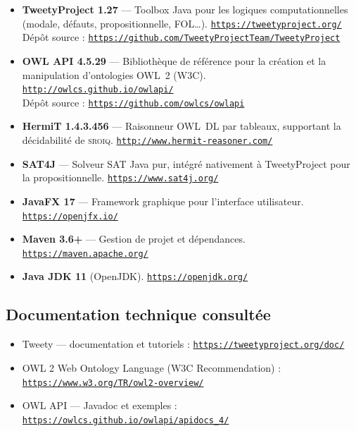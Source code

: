 \documentclass[11pt, a4paper]{article}
\begin{document}
\begin{itemize}
  \item \textbf{TweetyProject 1.27}
        --- Toolbox Java pour les logiques computationnelles
        (modale, défauts, propositionnelle, FOL\dots).
        \href{https://tweetyproject.org/}{\nolinkurl{https://tweetyproject.org/}}\\
        Dépôt source :
        \href{https://github.com/TweetyProjectTeam/TweetyProject}%
             {\nolinkurl{https://github.com/TweetyProjectTeam/TweetyProject}}

  \item \textbf{OWL API 4.5.29}
        --- Bibliothèque de référence pour la création et la manipulation
        d'ontologies OWL~2 (W3C).
        \href{http://owlcs.github.io/owlapi/}{\nolinkurl{http://owlcs.github.io/owlapi/}}\\
        Dépôt source :
        \href{https://github.com/owlcs/owlapi}{\nolinkurl{https://github.com/owlcs/owlapi}}

  \item \textbf{HermiT 1.4.3.456}
        --- Raisonneur OWL~DL par tableaux, supportant la décidabilité de
        \textsc{sroiq}.
        \href{http://www.hermit-reasoner.com/}{\nolinkurl{http://www.hermit-reasoner.com/}}

  \item \textbf{SAT4J} --- Solveur SAT Java pur, intégré nativement à
        TweetyProject pour la propositionnelle.
        \href{https://www.sat4j.org/}{\nolinkurl{https://www.sat4j.org/}}

  \item \textbf{JavaFX 17} --- Framework graphique pour l'interface utilisateur.
        \href{https://openjfx.io/}{\nolinkurl{https://openjfx.io/}}

  \item \textbf{Maven 3.6+} --- Gestion de projet et dépendances.
        \href{https://maven.apache.org/}{\nolinkurl{https://maven.apache.org/}}

  \item \textbf{Java JDK 11} (OpenJDK).
        \href{https://openjdk.org/}{\nolinkurl{https://openjdk.org/}}
\end{itemize}

\subsection*{Documentation technique consultée}

\begin{itemize}
  \item Tweety --- documentation et tutoriels :
        \href{https://tweetyproject.org/doc/}{\nolinkurl{https://tweetyproject.org/doc/}}

  \item OWL 2 Web Ontology Language (W3C Recommendation) :
        \href{https://www.w3.org/TR/owl2-overview/}{\nolinkurl{https://www.w3.org/TR/owl2-overview/}}

  \item OWL API --- Javadoc et exemples :
        \href{https://owlcs.github.io/owlapi/apidocs_4/}%
             {\nolinkurl{https://owlcs.github.io/owlapi/apidocs_4/}}
\end{itemize}
\end{document}
